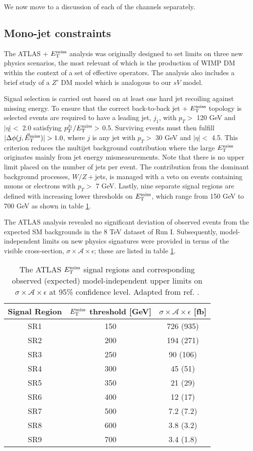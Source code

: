 We now move to a discussion of each of the \monoX channels separately.

\subsection{Mono-jet constraints}
\label{monojet_constraints}
The ATLAS \monojet + $E_{\mathrm{T}}^{\mathrm{miss}}$ analysis \cite{Aad:2015zva} was originally designed to set limits on three new physics scenarios, the most relevant of which is the production of WIMP DM within the context of a set of effective operators. The analysis also includes a brief study of a $Z'$ DM model which is analogous to our $sV$ model.

Signal selection is carried out based on at least one hard jet recoiling against missing energy. To ensure that the correct back-to-back jet + $E_{\mathrm{T}}^{\mathrm{miss}}$ topology is selected events are required to have a leading jet, $j_{1}$, with $p_{T} >$ 120 GeV and $|\eta| <$ 2.0 satisfying $p_{T}^{j_{1}}/E_{\mathrm{T}}^{\mathrm{miss}} >$ 0.5. Surviving events must then fulfill $|\Delta\phi(j,\metvec)|>1.0$, where $j$ is any jet with $p_{T} >$ 30 GeV and $|\eta| <$ 4.5. This criterion reduces the multijet background contribution where the large $E_{\mathrm{T}}^{\mathrm{miss}}$ originates mainly from jet energy mismeasurements. Note that there is no upper limit placed on the number of jets per event. The contribution from the dominant background processes, $W/Z+$jets, is managed with a veto on events containing muons or electrons with $p_{T}>$ 7 GeV. Lastly, nine separate signal regions are defined with increasing lower thresholds on $E_{\mathrm{T}}^{\mathrm{miss}}$, which range from 150 GeV to 700 GeV as shown in table \ref{monojet_SRs}.

The ATLAS \monojet analysis revealed no significant deviation of observed events from the expected SM backgrounds in the 8 TeV dataset of Run I. Subsequently, model-independent limits on new physics signatures were provided in terms of the visible cross-section, $\sigma\times\mathcal{A}\times\epsilon$; these are listed in table \ref{monojet_SRs}.

\begin{table}[!htbp]
\centering
\begin{tabular}{c|c|c}
 \hline
 \hline
 Signal Region & $E_{\mathrm{T}}^{\mathrm{miss}}$ threshold [GeV] & $\sigma \times \mathcal{A} \times \epsilon$ [fb] \\
 \hline
 SR1 & 150 & 726 (935) \\
 SR2 & 200 & 194 (271) \\
 SR3 & 250 & 90 (106) \\
 SR4 & 300 & 45 (51) \\
 SR5 & 350 & 21 (29) \\
 SR6 & 400 & 12 (17) \\
 SR7 & 500 & 7.2 (7.2) \\
 SR8 & 600 & 3.8 (3.2) \\
 SR9 & 700 & 3.4 (1.8) \\
 \hline
 \hline
\end{tabular}
\caption{The ATLAS \monojet $E_{\mathrm{T}}^{\mathrm{miss}}$ signal regions and corresponding observed (expected) model-independent upper limits on $\sigma \times \mathcal{A} \times \epsilon$ at 95\% confidence level. Adapted from ref. \cite{Aad:2015zva}.}
\label{monojet_SRs}
\end{table}

